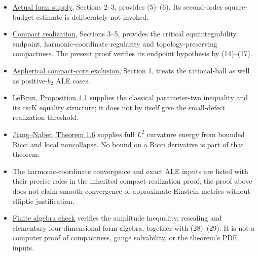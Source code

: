 \documentclass[
  11pt,
]{article}
\providecommand{\tightlist}{%
  \setlength{\itemsep}{0pt}\setlength{\parskip}{0pt}}
\begin{document}
\begin{itemize}
\tightlist
\item
  \href{../mathematics/current/line1_composed_application.md}{Actual
  form supply}, Sections 2--3, provides (5)--(6). Its second-order
  square-budget estimate is deliberately not invoked.
\item
  \href{20260923_compact_realization.md}{Compact realization}, Sections
  3--5, provides the critical equiintegrability endpoint,
  harmonic-coordinate regularity and topology-preserving compactness.
  The present proof verifies its endpoint hypothesis by (14)--(17).
\item
  \href{../mathematics/current/line1_aspherical_no_bubbles.md}{Aspherical
  compact-core exclusion}, Section 1, treats the rational-ball as well
  as positive-\(b_2\) ALE cases.
\item
  \href{https://arxiv.org/html/math/0003068}{LeBrun, Proposition 4.1}
  supplies the classical parameter-two inequality and its cscK equality
  structure; it does not by itself give the small-defect realization
  threshold.
\item
  \href{https://arxiv.org/html/1605.05583}{Jiang--Naber, Theorem 1.6}
  supplies full \(L^2\) curvature energy from bounded Ricci and local
  noncollapse. No bound on a Ricci derivative is part of that theorem.
\item
  The harmonic-coordinate convergence and exact ALE inputs are listed
  with their precise roles in the inherited compact-realization proof;
  the proof above does not claim smooth convergence of approximate
  Einstein metrics without elliptic justification.
\item
  \href{20260923_gauge_saturation_ke_check.py}{Finite algebra check}
  verifies the amplitude inequality, rescaling and elementary
  four-dimensional form algebra, together with (28)--(29). It is not a
  computer proof of compactness, gauge solvability, or the theorem's PDE
  inputs.
\end{itemize}
\end{document}
